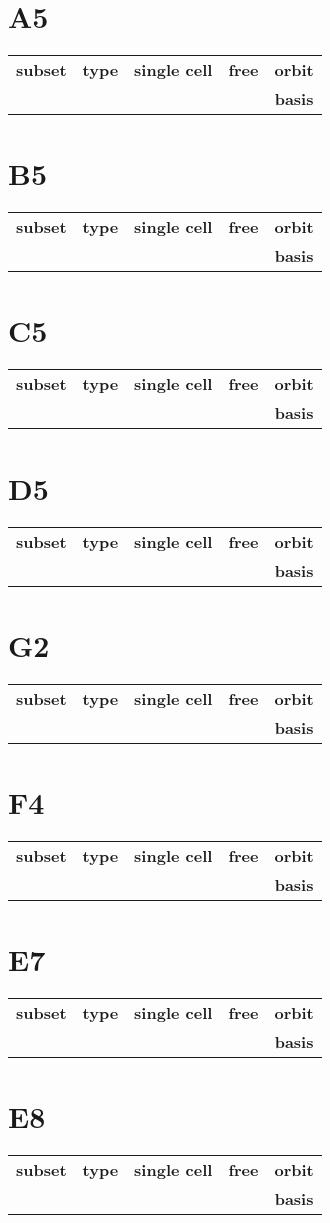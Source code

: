 \documentclass{article}
\newcommand{\resulttable}[1]{
  \section*{#1}
\begin{longtable}{llccc}
  \toprule
  \textbf{subset} & \textbf{type} & \textbf{single cell} & \textbf{free} & \textbf{orbit} \\
                  &               &                   &                & \textbf{basis} \\
  \midrule
  
  \bottomrule
\end{longtable}
}
\begin{document}
\resulttable{A5}\newpage
\resulttable{B5}\newpage
\resulttable{C5}\newpage
\resulttable{D5}\newpage
\resulttable{G2}
\resulttable{F4}\newpage
\resulttable{E7}\newpage
\resulttable{E8}
\end{document}
